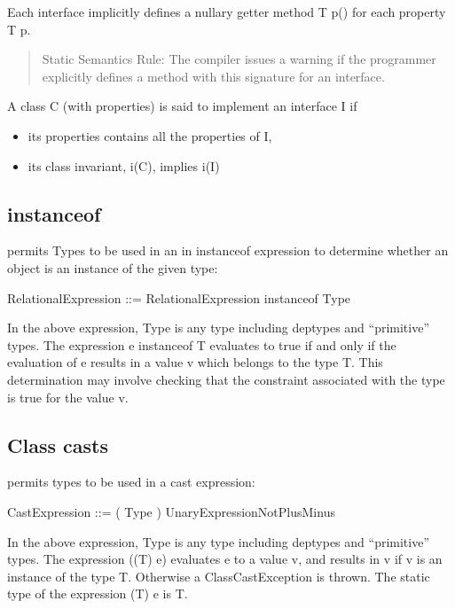 Each interface implicitly defines a nullary getter method {\cf T p()} for
each property {\cf T p}. 

\begin{quotation}
   {\sc Static Semantics Rule:} The compiler issues a warning if the programmer
   explicitly defines a method with this signature for an interface.
  
\end{quotation}

A class {\cf C} (with properties) is said to implement an interface {\cf I} if
\begin{itemize}
  \item its properties contains all the properties of I,
\item its class invariant, i(C), implies i(I)
\end{itemize}


\subsection{instanceof} 

\Xten{} permits Types to be used in an in instanceof expression to
determine whether an object is an instance of the given type:

\begin{x10}
RelationalExpression ::= 
  RelationalExpression instanceof Type  
\end{x10}

In the above expression, {\cf Type} is any type including deptypes and
``primitive'' types. The expression {\cf e instanceof T} evaluates to true
if and only if the evaluation of {\cf e} results in a value {\cf v} which belongs
to the type {\cf T}. This determination may involve checking that the
constraint associated with the type is true for the value {\cf v}.

\subsection{Class casts}

\Xten{} permits types to be used in a cast expression:

\begin{x10}
CastExpression ::= 
  ( Type ) UnaryExpressionNotPlusMinus  
\end{x10}

In the above expression, Type is any type including deptypes and
``primitive'' types. The expression {\cf ((T) e)} evaluates {\cf e} to
a value {\cf v}, and results in {\cf v} if {\cf v} is an instance of
the type {\cf T}. Otherwise a {\cf ClassCastException} is thrown. The
static type of the expression {\cf (T) e} is {\cf T}.

